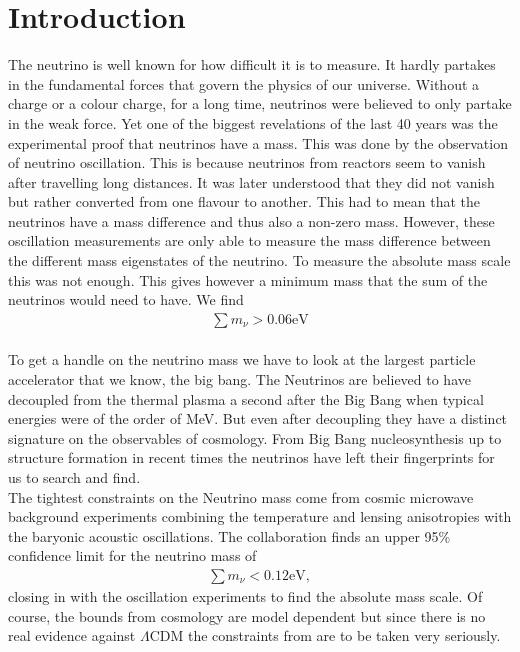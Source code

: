 \documentclass[../main.tex]{subfiles}
\begin{document}
\chapter{Introduction}
The neutrino is well known for how difficult it is to measure. It hardly partakes in the fundamental forces that govern the physics of our universe. Without a charge or a colour charge, for a long time, neutrinos were believed to only partake in the weak force. Yet one of the biggest revelations of the last 40 years was the experimental proof that neutrinos have a mass. This was done by the observation of neutrino oscillation. This is because neutrinos from reactors seem to vanish after travelling long distances. It was later understood that they did not vanish but rather converted from one flavour to another. This had to mean that the neutrinos have a mass difference and thus also a non-zero mass. However, these oscillation measurements are only able to measure the mass difference between the different mass eigenstates of the neutrino. To measure the absolute mass scale this was not enough. This gives however a minimum mass that the sum of the neutrinos would need to have. We find \begin{align*}
     \sum m_\nu > 0.06 \mathrm{eV}
\end{align*}\\
To get a handle on the neutrino mass we have to look at the largest particle accelerator that we know, the big bang. The Neutrinos are believed to have decoupled from the thermal plasma a second after the Big Bang when typical energies were of the order of MeV. But even after decoupling they have a distinct signature on the observables of cosmology. From Big Bang nucleosynthesis up to structure formation in recent times the neutrinos have left their fingerprints for us to search and find.\\
The tightest constraints on the Neutrino mass come from cosmic microwave background experiments combining the temperature and lensing anisotropies with the baryonic acoustic oscillations. The \Planck collaboration finds an upper 95\% confidence limit for the neutrino mass of 
\begin{align*}
    \sum m_\nu < 0.12 \mathrm{eV},
\end{align*}
closing in with the oscillation experiments to find the absolute mass scale. Of course, the bounds from cosmology are model dependent but since there is no real evidence against $\Lambda$CDM the constraints from \Planck are to be taken very seriously.\\
\end{document}

